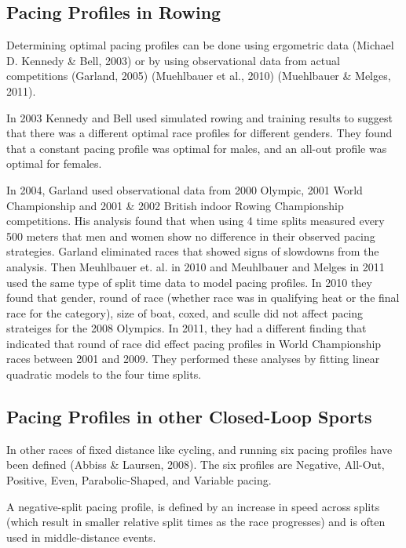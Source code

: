 \documentclass[11pt,]{article}
\begin{document}
\subsection{Pacing Profiles in Rowing}\label{pacing-profiles-in-rowing}

Determining optimal pacing profiles can be done using ergometric data
(Michael D. Kennedy \& Bell, 2003) or by using observational data from
actual competitions (Garland, 2005) (Muehlbauer et al., 2010)
(Muehlbauer \& Melges, 2011).

In 2003 Kennedy and Bell used simulated rowing and training results to
suggest that there was a different optimal race profiles for different
genders. They found that a constant pacing profile was optimal for
males, and an all-out profile was optimal for females.

In 2004, Garland used observational data from 2000 Olympic, 2001 World
Championship and 2001 \& 2002 British indoor Rowing Championship
competitions. His analysis found that when using 4 time splits measured
every 500 meters that men and women show no difference in their observed
pacing strategies. Garland eliminated races that showed signs of
slowdowns from the analysis. Then Meuhlbauer et. al. in 2010 and
Meuhlbauer and Melges in 2011 used the same type of split time data to
model pacing profiles. In 2010 they found that gender, round of race
(whether race was in qualifying heat or the final race for the
category), size of boat, coxed, and sculle did not affect pacing
strateiges for the 2008 Olympics. In 2011, they had a different finding
that indicated that round of race did effect pacing profiles in World
Championship races between 2001 and 2009. They performed these analyses
by fitting linear quadratic models to the four time splits.

\subsection{Pacing Profiles in other Closed-Loop
Sports}\label{pacing-profiles-in-other-closed-loop-sports}

In other races of fixed distance like cycling, and running six pacing
profiles have been defined (Abbiss \& Laursen, 2008). The six profiles
are Negative, All-Out, Positive, Even, Parabolic-Shaped, and Variable
pacing.

A negative-split pacing profile, is defined by an increase in speed
across splits (which result in smaller relative split times as the race
progresses) and is often used in middle-distance events.
\end{document}
